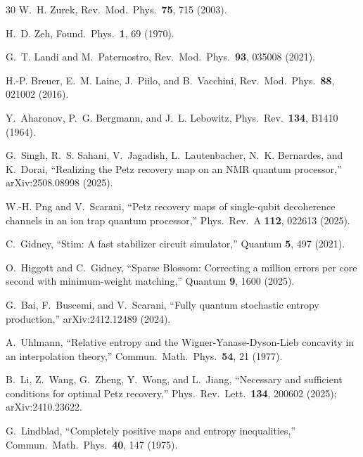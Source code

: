 \documentclass[prl,twocolumn,superscriptaddress,longbibliography]{revtex4-2}
\begin{document}
\begin{thebibliography}{30}
W.~H. Zurek,
Rev.\ Mod.\ Phys.\ \textbf{75}, 715 (2003).

H.~D. Zeh,
Found.\ Phys.\ \textbf{1}, 69 (1970).

G.~T. Landi and M.~Paternostro,
Rev.\ Mod.\ Phys.\ \textbf{93}, 035008 (2021).

H.-P. Breuer, E.~M. Laine, J.~Piilo, and B.~Vacchini,
Rev.\ Mod.\ Phys.\ \textbf{88}, 021002 (2016).

Y.~Aharonov, P.~G. Bergmann, and J.~L. Lebowitz,
Phys.\ Rev.\ \textbf{134}, B1410 (1964).

G.~Singh, R.~S. Sahani, V.~Jagadish, L.~Lautenbacher,
N.~K. Bernardes, and K.~Dorai,
``Realizing the Petz recovery map on an NMR quantum processor,''
arXiv:2508.08998 (2025).

W.-H. Png and V.~Scarani,
``Petz recovery maps of single-qubit decoherence channels in an
ion trap quantum processor,''
Phys.\ Rev.\ A \textbf{112}, 022613 (2025).

C.~Gidney,
``Stim: A fast stabilizer circuit simulator,''
Quantum \textbf{5}, 497 (2021).

O.~Higgott and C.~Gidney,
``Sparse Blossom: Correcting a million errors per core second with
minimum-weight matching,''
Quantum \textbf{9}, 1600 (2025).

G.~Bai, F.~Buscemi, and V.~Scarani,
``Fully quantum stochastic entropy production,''
arXiv:2412.12489 (2024).

A.~Uhlmann,
``Relative entropy and the Wigner-Yanase-Dyson-Lieb concavity in an interpolation theory,''
Commun.\ Math.\ Phys.\ \textbf{54}, 21 (1977).

B.~Li, Z.~Wang, G.~Zheng, Y.~Wong, and L.~Jiang,
``Necessary and sufficient conditions for optimal Petz recovery,''
Phys.\ Rev.\ Lett.\ \textbf{134}, 200602 (2025);
arXiv:2410.23622.

G.~Lindblad,
``Completely positive maps and entropy inequalities,''
Commun.\ Math.\ Phys.\ \textbf{40}, 147 (1975).

\end{thebibliography}
\end{document}
